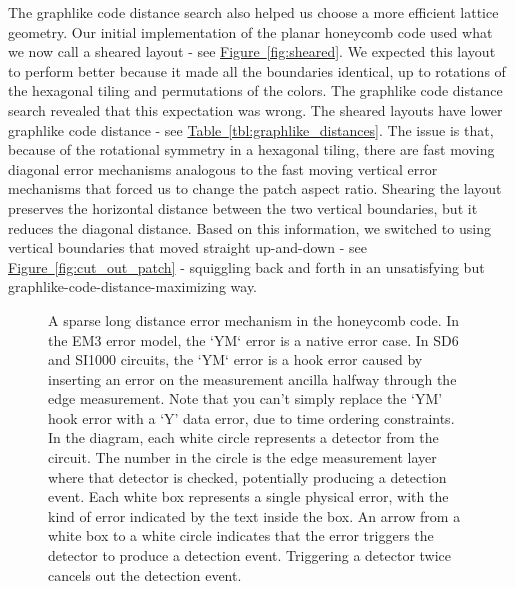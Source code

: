 \documentclass[onecolumn,unpublished,a4paper]{quantumarticle}
\theoremstyle{definition}
\theoremstyle{definition}
\theoremstyle{definition}
\newcommand{\fig}[1]{\hyperref[fig:#1]{Figure~\ref*{fig:#1}}}
\newcommand{\tbl}[1]{\hyperref[tbl:#1]{Table~\ref*{tbl:#1}}}
\begin{document}
The graphlike code distance search also helped us choose a more efficient lattice geometry.
Our initial implementation of the planar honeycomb code used what we now call a sheared layout - see \fig{sheared}.
We expected this layout to perform better because it made all the boundaries identical, up to rotations of the hexagonal tiling and permutations of the colors.
The graphlike code distance search revealed that this expectation was wrong.
The sheared layouts have lower graphlike code distance - see \tbl{graphlike_distances}.
The issue is that, because of the rotational symmetry in a hexagonal tiling, there are fast moving diagonal error mechanisms analogous to the fast moving vertical error mechanisms that forced us to change the patch aspect ratio.
Shearing the layout preserves the horizontal distance between the two vertical boundaries, but it reduces the diagonal distance.
Based on this information, we switched to using vertical boundaries that moved straight up-and-down - see \fig{cut_out_patch} - squiggling back and forth in an unsatisfying but graphlike-code-distance-maximizing way.

\begin{figure}[ht!]
    \centering
    \caption{
    A sparse long distance error mechanism in the honeycomb code.
    In the EM3 error model, the `YM` error is a native error case.
    In SD6 and SI1000 circuits, the `YM` error is a hook error caused by inserting an error on the measurement ancilla halfway through the edge measurement.
    Note that you can't simply replace the `YM' hook error with a `Y' data error, due to time ordering constraints.
    In the diagram, each white circle represents a detector from the circuit.
    The number in the circle is the edge measurement layer where that detector is checked, potentially producing a detection event.
    Each white box represents a single physical error, with the kind of error indicated by the text inside the box.
    An arrow from a white box to a white circle indicates that the error triggers the detector to produce a detection event.
    Triggering a detector twice cancels out the detection event.
    }
    \label{fig:bad_error}
\end{figure}
\end{document}
